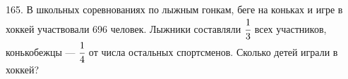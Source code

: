 165. В школьных соревнованиях по лыжным гонкам, беге на коньках и игре в хоккей участвовали 696 человек. Лыжники составляли $\cfrac{1}{3}$ всех участников, конькобежцы --- $\cfrac{1}{4}$ от числа остальных спортсменов. Сколько детей играли в хоккей?\\
